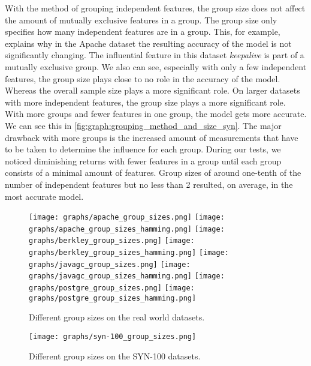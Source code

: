\documentclass[../../thesis.tex]{subfiles}
\begin{document}
With the method of grouping independent features, the group size does not affect the amount of mutually exclusive features
in a group. The group size only specifies how many independent features are in a group.
This, for example, explains why in the Apache dataset the resulting
accuracy of the model is not significantly changing. The influential feature in this dataset \textit{keepalive} is part of a mutually exclusive group.
We also can see, especially with only a few independent features, the group size plays close to no role
in the accuracy of the model. Whereas the overall sample size plays a more significant role.
On larger datasets with more independent features, the group size plays a more significant role.
With more groups and fewer features in one group, the model gets more accurate. 
We can see this in \autoref{fig:graph:grouping_method_and_size_syn}. 
The major drawback with more groups is the increased amount of measurements that have to be 
taken to determine the influence for each group. During our tests, we noticed diminishing returns 
with fewer features in a group until each group consists of a minimal amount of features.
Group sizes of around one-tenth of the number of independent features but no less than 2 resulted, on average,
in the most accurate model.



\begin{figure}[!htp]
    \texttt{[image: graphs/apache\_group\_sizes.png]}
    \texttt{[image: graphs/apache\_group\_sizes\_hamming.png]}
    \texttt{[image: graphs/berkley\_group\_sizes.png]}
    \texttt{[image: graphs/berkley\_group\_sizes\_hamming.png]}
    \texttt{[image: graphs/javagc\_group\_sizes.png]}
    \texttt{[image: graphs/javagc\_group\_sizes\_hamming.png]}
    \texttt{[image: graphs/postgre\_group\_sizes.png]}
    \texttt{[image: graphs/postgre\_group\_sizes\_hamming.png]}
    \caption[Different group sizes on the real world datasets]{
        Different group sizes on the real world datasets.
    }\label{fig:graph:grouping_method_and_size_real}
\end{figure}

\begin{figure}[!htp]
    \begin{center}
        \texttt{[image: graphs/syn-100\_group\_sizes.png]}
    \end{center}
    \caption[Different group sizes on the SYN-100 datasets]{
        Different group sizes on the SYN-100 datasets.
    }\label{fig:graph:grouping_method_and_size_syn}
\end{figure}
\end{document}

